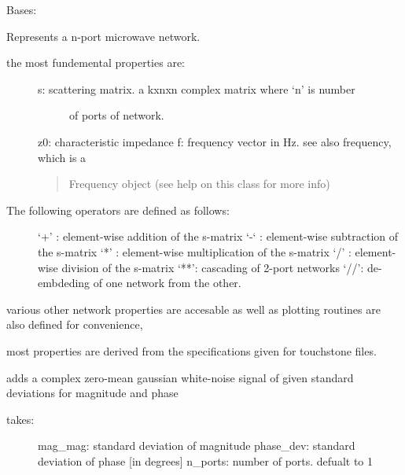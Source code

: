 \documentclass[letterpaper,10pt,english]{sphinxmanual}
\begin{document}
\begin{fulllineitems}
\label{api/mwavepy:mwavepy.network.Network}
Bases: 

Represents a n-port microwave network.
\begin{description}
\item[{the most fundemental properties are:}] \leavevmode\begin{description}
\item[{s: scattering matrix. a kxnxn complex matrix where `n' is number}] \leavevmode
of ports of network.

\end{description}

z0: characteristic impedance
f: frequency vector in Hz. see also frequency, which is a
\begin{quote}

Frequency object (see help on this class for more info)
\end{quote}

\item[{The following operators are defined as follows:}] \leavevmode
`+' : element-wise addition of the s-matrix
`-` : element-wise subtraction of the s-matrix
`*' : element-wise multiplication of the s-matrix
`/' : element-wise division of the s-matrix
`**': cascading of 2-port networks
`//': de-embdeding of one network from the other.

\end{description}

various other network properties are accesable as well as plotting
routines are also defined for convenience,

most properties are derived from the specifications given for
touchstone files.

\begin{fulllineitems}
\label{api/mwavepy:mwavepy.network.Network.add_noise_polar}
adds a complex zero-mean gaussian white-noise signal of given
standard deviations for magnitude and phase
\begin{description}
\item[{takes:}] \leavevmode
mag\_mag: standard deviation of magnitude
phase\_dev: standard deviation of phase {[}in degrees{]}
n\_ports: number of ports. defualt to 1


\end{description}
\end{fulllineitems}
\end{fulllineitems}
\end{document}
